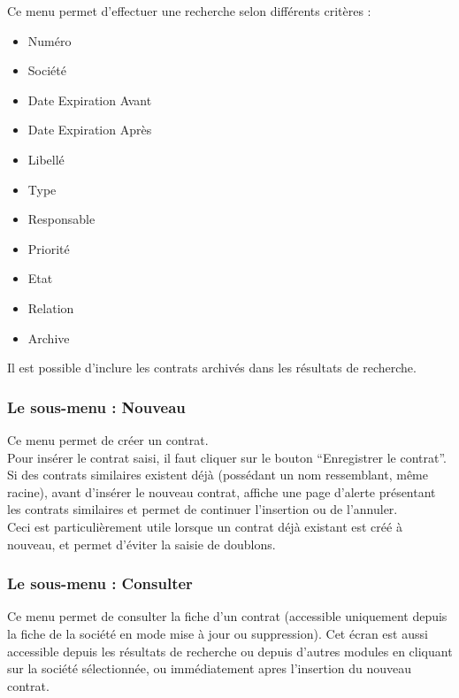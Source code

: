 Ce menu permet d'effectuer une recherche selon différents critères :

\begin{itemize}
\item Numéro
\item Société
\item Date Expiration Avant
\item Date Expiration Après
\item Libellé
\item Type
\item Responsable
\item Priorité
\item Etat
\item Relation
\item Archive
\end{itemize}

Il est possible d'inclure les contrats archivés dans les résultats de recherche.


\subsubsection{Le sous-menu : Nouveau}

Ce menu permet de créer un contrat.\\

Pour insérer le contrat saisi, il faut cliquer sur le bouton ``Enregistrer le contrat''.\\

Si des contrats similaires existent déjà (possédant un nom ressemblant, même racine), avant d'insérer le nouveau contrat, \obm affiche une page d'alerte présentant les contrats similaires et permet de continuer l'insertion ou de l'annuler.\\
Ceci est particulièrement utile lorsque un contrat déjà existant est créé à nouveau, et permet d'éviter la saisie de doublons.\\


\subsubsection{Le sous-menu : Consulter}

Ce menu permet de consulter la fiche d'un contrat (accessible uniquement depuis la fiche de la société en mode mise à jour ou suppression).
Cet écran est aussi accessible depuis les résultats de recherche ou depuis d'autres modules en cliquant sur la société sélectionnée, ou immédiatement apres l'insertion du nouveau contrat.

